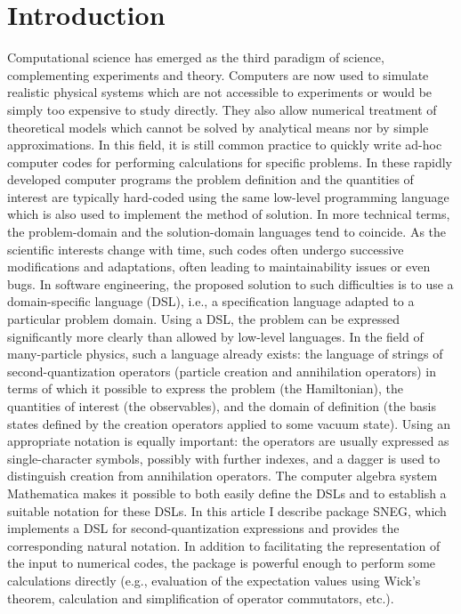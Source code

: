 \documentclass[3p,number,preprint]{elsarticle}
\begin{document}
\newcommand{\vc}[1]{\boldsymbol{#1}}
\newcommand{\ket}[1]{\left| #1 \right\rangle}
\newcommand{\bra}[1]{\left\langle #1 \right|}
\newcommand{\vev}[1]{\left\langle #1 \right\rangle}
\newcommand{\braket}[1]{\langle #1 \rangle}


\newcommand{\mma}[1]{{\tt #1}}


\section{Introduction}

Computational science has emerged as the third paradigm of science,
complementing experiments and theory. Computers are now used to 
simulate realistic physical systems which are not accessible to
experiments or would be simply too expensive to study directly. They
also allow numerical treatment of theoretical models which cannot be
solved by analytical means nor by simple approximations. In this
field, it is still common practice to quickly write ad-hoc computer
codes for performing calculations for specific problems. In these
rapidly developed computer programs the problem definition and the
quantities of interest are typically hard-coded using the same
low-level programming language which is also used to implement the
method of solution. In more technical terms, the problem-domain and
the solution-domain languages tend to coincide. As the scientific
interests change with time, such codes often undergo successive
modifications and adaptations, often leading to maintainability issues
or even bugs. In software engineering, the proposed solution to such
difficulties is to use a domain-specific language (DSL), i.e., a
specification language adapted to a particular problem domain. Using a
DSL, the problem can be expressed significantly more clearly than
allowed by low-level languages. In the field of many-particle physics,
such a language already exists: the language of strings of
second-quantization operators (particle creation and annihilation
operators) in terms of which it possible to express the problem (the
Hamiltonian), the quantities of interest (the observables), and the
domain of definition (the basis states defined by the creation
operators applied to some vacuum state). Using an appropriate notation
is equally important: the operators are usually expressed as
single-character symbols, possibly with further indexes, and a dagger
is used to distinguish creation from annihilation operators. The
computer algebra system Mathematica makes it possible to both easily
define the DSLs and to establish a suitable notation for these DSLs.
In this article I describe package SNEG, which implements a DSL for
second-quantization expressions and provides the corresponding natural
notation. In addition to facilitating the representation of the input
to numerical codes, the package is powerful enough to perform some
calculations directly (e.g., evaluation of the expectation values
using Wick's theorem, calculation and simplification of operator
commutators, etc.).
\end{document}
